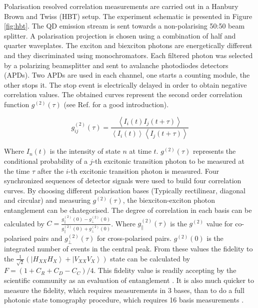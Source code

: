 \documentclass[12pt, twoside]{article}
\numberwithin{equation}{section}
\begin{document}
Polarisation resolved correlation measurements are carried out in a
Hanbury Brown and Twiss (HBT) setup. The experiment schematic is
presented in Figure \ref{fig:hbt}. The QD emission stream is sent
towards a non-polarising 50:50 beam splitter. A polarisation projection
is chosen using a combination of half and quarter waveplates. The
exciton and biexciton photons are energetically different and they
discriminated using monochromators. Each filtered photon was selected by
a polarizing beamsplitter and sent to avalanche photodiodes detectors
(APDs). Two APDs are used in each channel, one starts a counting module,
the other stops it. The stop event is electrically delayed in order to
obtain negative correlation values. The obtained curves represent the
second order correlation function $g^{(2)}(\tau)$ (see Ref. \cite{fox}
for a good introduction).

\begin{equation}
g_{ij}^{(2)}(\tau) = \frac{\left\langle I_i(t)I_j(t+\tau) \right\rangle}{\left\langle I_i(t) \right\rangle \left\langle I_j(t+\tau) \right\rangle}
\end{equation}

Where $I_n(t)$ is the intensity of state $n$ at time $t$.
$g^{(2)}(\tau)$ represents the conditional probability of a $j$-th
excitonic transition photon to be measured at the time $\tau$ after the
$i$-th excitonic transition photon is measured. Four synchronized
sequences of detector signals were used to build four correlation
curves. By choosing different polarisation bases (Typically rectilinear,
diagonal and circular) and measuring $g^{(2)}(\tau)$, the
biexciton-exciton photon entanglement can be chategorised. The degree of
correlation in each basis can be calculated by
$C = \frac{ g^{(2)}_{\parallel}(0) - g^{(2)}_{\perp}(0) }{ g^{(2)}_{\parallel}(0) + g^{(2)}_{\perp}(0) }$.
Where $g^{(2)}_{\parallel}(\tau)$ is the $g^{(2)}$ value for
co-polarised pairs and $g^{(2)}_{\perp}(\tau)$ for cross-polarised
pairs. $g^{(2)}(0)$ is the integrated number of events in the central
peak. From these values the fidelity to the
$\frac{1}{\sqrt{2}} \left(\left|H_{XX} H_X\right\rangle + \left|V_{XX} V_X\right\rangle \right)$
state can be calculated by $F = \left(1 + C_R + C_D - C_C \right)/4$.
This fidelity value is readily accepting by the scientific community as
an evaluation of entanglement \cite{f1, entandiode}. It is also much
quicker to measure the fidelity, which requires measurements in 3 bases,
than to do a full photonic state tomography procedure, which requires 16
basis measurements \cite{amotomo}.
\end{document}
